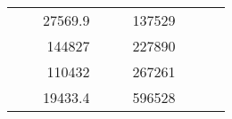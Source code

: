 \begin{table}[H]
\begin{tabular}{|ccrccrccr}
\multicolumn{1}{|c|}{\cellcolor[HTML]{FFFFC7}}                                & \multicolumn{1}{c|}{\cellcolor[HTML]{DDFDFF}}                      & \multicolumn{1}{r|}{\cellcolor[HTML]{DAE8FC}27569.9}   & \multicolumn{1}{c|}{\cellcolor[HTML]{FFFFC7}}                                & \multicolumn{1}{c|}{\cellcolor[HTML]{DDFDFF}}                       & \multicolumn{1}{r|}{\cellcolor[HTML]{DDFDFF}137529}    &                                                                              &                                                                    &                                                        \\ \cline{3-3} \cline{6-6}
\multicolumn{1}{|c|}{\cellcolor[HTML]{FFFFC7}}                                & \multicolumn{1}{c|}{\cellcolor[HTML]{DDFDFF}}                      & \multicolumn{1}{r|}{\cellcolor[HTML]{DDFDFF}144827}    & \multicolumn{1}{c|}{\cellcolor[HTML]{FFFFC7}}                                & \multicolumn{1}{c|}{\cellcolor[HTML]{DDFDFF}}                       & \multicolumn{1}{r|}{\cellcolor[HTML]{DAE8FC}227890}    &                                                                              &                                                                    &                                                        \\ \cline{3-3} \cline{6-6}
\multicolumn{1}{|c|}{\cellcolor[HTML]{FFFFC7}}                                & \multicolumn{1}{c|}{\cellcolor[HTML]{DDFDFF}}                      & \multicolumn{1}{r|}{\cellcolor[HTML]{DAE8FC}110432}    & \multicolumn{1}{c|}{\cellcolor[HTML]{FFFFC7}}                                & \multicolumn{1}{c|}{\cellcolor[HTML]{DDFDFF}}                       & \multicolumn{1}{r|}{\cellcolor[HTML]{DDFDFF}267261}    &                                                                              &                                                                    &                                                        \\ \cline{3-3} \cline{6-6}
\multicolumn{1}{|c|}{\cellcolor[HTML]{FFFFC7}}                                & \multicolumn{1}{c|}{\cellcolor[HTML]{DDFDFF}}                      & \multicolumn{1}{r|}{\cellcolor[HTML]{DDFDFF}19433.4}   & \multicolumn{1}{c|}{\cellcolor[HTML]{FFFFC7}}                                & \multicolumn{1}{c|}{\cellcolor[HTML]{DDFDFF}}                       & \multicolumn{1}{r|}{\cellcolor[HTML]{DAE8FC}596528}    &                                                                              &                                                                    &                                                        \\ \cline{3-3} \cline{6-6}

\end{tabular}
\end{table}
